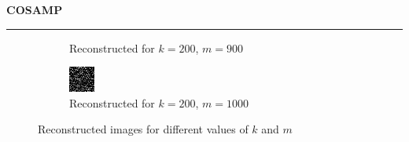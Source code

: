 \documentclass[a4paper,12pt]{article}
\newenvironment{solution}[2][]{%
    \begin{mdframed}[linecolor=blue!70!black, linewidth=2pt, roundcorner=10pt, backgroundcolor=yellow!10!white, skipabove=12pt, skipbelow=12pt]%
        \textbf{\large #2}
        \par\noindent\rule{\textwidth}{0.4pt}
}{
    \end{mdframed}
}
\begin{document}
\begin{solution}{COSAMP}
\begin{figure}[H]
\begin{subfigure}[t]{0.23\textwidth}
            \caption{Reconstructed for $k = 200$, $m = 900$}
        \end{subfigure}
        \begin{subfigure}[t]{0.23\textwidth}
            \centering
            \includegraphics[width=\textwidth]{../images/cosamp/Reconstructed_k_200_m_1000.png}
            \caption{Reconstructed for $k = 200$, $m = 1000$}
        \end{subfigure}
        \caption{Reconstructed images for different values of $k$ and $m$}
        \label{fig:reconstructed_all2}
    \end{figure}
    \end{solution}
\end{document}
